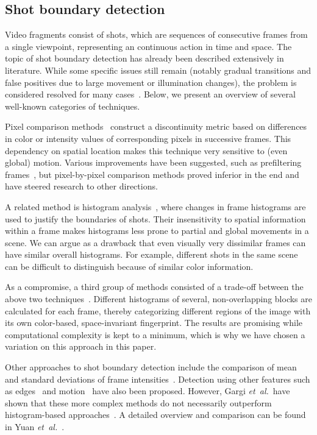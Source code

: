 \documentclass[10pt,twocolumn,letterpaper]{article}
\begin{document}
\subsection{Shot boundary detection}

Video fragments consist of shots, which are sequences of consecutive frames from a single viewpoint,
representing an continuous action in time and space.
The topic of shot boundary detection has already been described extensively in literature.
While some specific issues still remain (notably gradual transitions and false positives due to large movement or illumination changes),
the problem is considered resolved for many cases~\cite{Hanjalic2002, Yuan2007}.
Below, we present an overview of several well-known categories of techniques.

Pixel comparison methods~\cite{Hampapur1994, Zhang1993} construct a discontinuity metric based on differences in color or intensity values of corresponding pixels in successive frames.
This dependency on spatial location makes this technique very sensitive to (even global) motion.
Various improvements have been suggested, such as prefiltering frames~\cite{Zhang1995},
but pixel-by-pixel comparison methods proved inferior in the end and have steered research to other directions.

A related method is histogram analysis~\cite{Smeaton1999}, where changes in frame histograms are used to justify the boundaries of shots.
Their insensitivity to spatial information within a frame makes histograms less prone to partial and global movements in a scene.
We can argue as a drawback that even visually very dissimilar frames can have similar overall histograms.
For example, different shots in the same scene can be difficult to distinguish because of similar color information.

As a compromise, a third group of methods consisted of a trade-off between the above two techniques~\cite{Ahmed1999}.
Different histograms of several, non-overlapping blocks are calculated for each frame,
thereby categorizing different regions of the image with its own color-based, space-invariant fingerprint.
The results are promising while computational complexity is kept to a minimum,
which is why we have chosen a variation on this approach in this paper.

Other approaches to shot boundary detection include the comparison of mean and standard deviations of frame intensities~\cite{Lienhart1999}.
Detection using other features such as edges~\cite{Zabih1995} and motion~\cite{Bouthemy1997} have also been proposed.
However, Gargi \emph{et~al.}\ have shown that these more complex methods do not necessarily outperform histogram-based approaches~\cite{Gargi2000}.
A detailed overview and comparison can be found in Yuan \emph{et~al.}~\cite{Yuan2007}.
\end{document}

